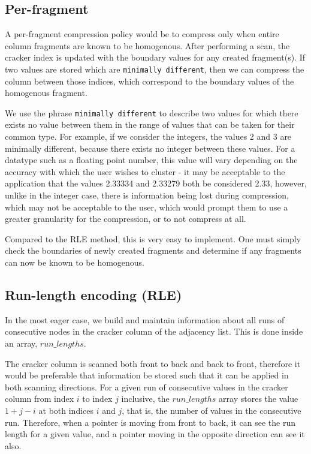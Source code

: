 \subsection{Per-fragment}

A per-fragment compression policy would be to compress only when entire column fragments are
known to be homogenous. After performing a scan, the cracker index is updated with the boundary
values for any created fragment(s). If two values are stored which are \texttt{minimally different},
then we can compress the column between those indices, which correspond to the boundary values of the
homogenous fragment.

We use the phrase \texttt{minimally different} to describe two values for which there exists no value
between them in the range of values that can be taken for their common type. For example, if we
consider the integers, the values 2 and 3 are minimally different, because there exists no integer
between these values. For a datatype such as a floating point number, this value will vary depending
on the accuracy with which the user wishes to cluster - it may be acceptable to the application that
the values 2.33334 and 2.33279 both be considered 2.33, however, unlike in the integer case, there is
information being lost during compression, which may not be acceptable to the user, which would prompt
them to use a greater granularity for the compression, or to not compress at all.

Compared to the RLE method, this is very easy to implement. One must simply check the boundaries of
newly created fragments and determine if any fragments can now be known to be homogenous.

\subsection{Run-length encoding (RLE)}

In the most eager case, we build and maintain information about all runs of consecutive nodes in the
cracker column of the adjacency list. This is done inside an array, $run\_lengths$.

The cracker column is scanned both front to back and back to front, therefore it would be preferable
that information be stored such that it can be applied in both scanning directions. For a given run of
consecutive values in the cracker column from index $i$ to index $j$ inclusive, the $run\_lengths$
array stores the value $1 + j - i$ at both indices $i$ and $j$, that is, the number of values in the
consecutive run. Therefore, when a pointer is moving from front to back, it can see the run length for
a given value, and a pointer moving in the opposite direction can see it also.

